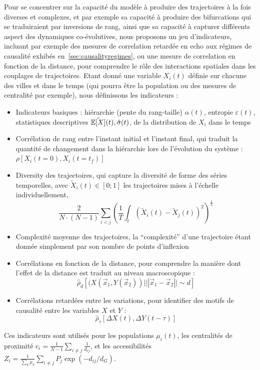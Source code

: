 Pour se concentrer sur la capacité du modèle à produire des trajectoires à la fois diverses et complexes, et par exemple sa capacité à produire des bifurcations qui se traduiraient par inversions de rang, ainsi que sa capacité à capturer différents aspect des dynamiques co-évolutives, nous proposons un jeu d'indicateurs, incluant par exemple des mesures de correlation retardée en echo aux régimes de causalité exhibés en~\ref{sec:causalityregimes}, ou une mesure de correlation en fonction de la distance, pour comprendre le rôle des interactions spatiales dans les couplages de trajectoires. Etant donné une variable $X_i(t)$ définie sur chacune des villes et dans le temps (qui pourra être la population ou des mesures de centralité par exemple), nous définissons les indicateurs :

\begin{itemize}
  \item Indicateurs basiques : hiérarchie (pente du rang-taille) $\alpha (t)$, entropie $\varepsilon (t)$, statistiques descriptives $\hat{\operatorname{\mathbb{E}}\!\left[X\right]} (t), \hat{\sigma} (t)$, de la distribution de $X_i$ dans le temps
  \item Corrélation de rang entre l'instant initial et l'instant final, qui traduit la quantité de changement dans la hiérarchie lors de l'évolution du système : $\rho\left[X_i(t=0),X_i(t=t_f)\right]$
  \item Diversity des trajectoires, qui capture la diversité de forme des séries temporelles, avec $\tilde{X}_i(t)\in \left[0;1\right]$ les trajectoires mises à l'échelle individuellement,
\[
\frac{2}{N\cdot(N-1)}\sum_{i<j} \left(\frac{1}{T}\int_{t} \left(\tilde{X}_i(t) - \tilde{X}_j(t)\right)^2 \right)^{\frac{1}{2}}
\]
\item Complexité moyenne des trajectoires, la ``complexité'' d'une trajectoire étant donnée simplement par son nombre de points d'inflexion
\item Corrélations en fonction de la distance, pour comprendre la manière dont l'effet de la distance est traduit au niveau macroscopique : 
\[
\hat{\rho}_d\left[(X(\vec{x}_1,Y(\vec{x}_2))|||\vec{x}_1-\vec{x}_2||\sim d\right]
\]
\item Corrélations retardées entre les variations, pour identifier des motifs de causalité entre les variables $X$ et $Y$ : \[
\hat{\rho}_{\tau}\left[\Delta X(t),\Delta Y(t-\tau)\right]
\]
\end{itemize}

Ces indicateurs sont utilisés pour les populations $\mu_i(t)$, les centralités de proximité $c_i = \frac{1}{N-1}\sum_{i\neq j} \frac{1}{d_{ij}}$, et les accessibilités $Z_i = \frac{1}{\sum_k \mu_k}\sum_{i\neq j} P_j \exp{\left(- d_{ij}/d_G\right)}$.



